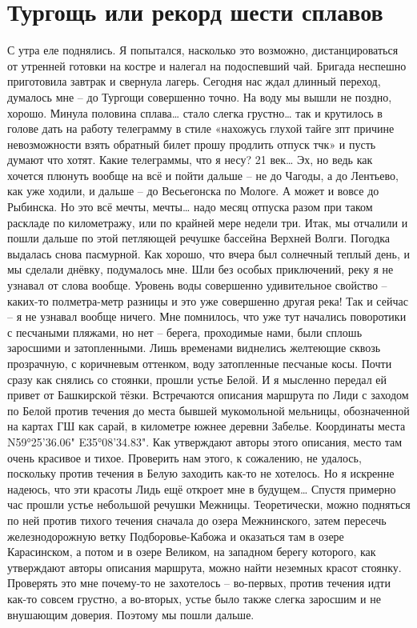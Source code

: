 \chapter{Тургощь или рекорд шести сплавов} 

С утра еле поднялись. Я попытался, насколько это возможно, дистанцироваться от утренней готовки на костре и налегал на подоспевший чай. Бригада неспешно приготовила завтрак и свернула лагерь. Сегодня нас ждал длинный переход, думалось мне – до Тургощи совершенно точно. На воду мы вышли не поздно, хорошо.  
Минула половина сплава… стало слегка грустно… так и крутилось в голове дать на работу телеграмму в стиле «нахожусь глухой тайге зпт причине невозможности взять обратный билет прошу продлить отпуск тчк» и пусть думают что хотят. Какие телеграммы, что я несу? 21 век… Эх, но ведь как хочется плюнуть вообще на всё и пойти дальше – не до Чагоды, а до Лентьево, как уже ходили, и дальше – до Весьегонска по Мологе. А может и вовсе до Рыбинска. Но это всё мечты, мечты… надо месяц отпуска разом при таком раскладе по километражу, или по крайней мере недели три.
Итак, мы отчалили и пошли дальше по этой петляющей речушке бассейна Верхней Волги. Погодка выдалась снова пасмурной. Как хорошо, что вчера был солнечный теплый день, и мы сделали днёвку, подумалось мне. Шли без особых приключений, реку я не узнавал от слова вообще. Уровень воды совершенно удивительное свойство – каких-то полметра-метр разницы и это уже совершенно другая река! Так и сейчас – я не узнавал вообще ничего. Мне помнилось, что уже тут начались поворотики с песчаными пляжами, но нет – берега, проходимые нами, были сплошь заросшими и затопленными. Лишь временами виднелись желтеющие сквозь прозрачную, с коричневым оттенком, воду затопленные песчаные косы.
Почти сразу как снялись со стоянки, прошли устье Белой. И я мысленно передал ей привет от Башкирской тёзки. Встречаются описания маршрута по Лиди с заходом по Белой против течения до места бывшей мукомольной мельницы, обозначенной на картах ГШ как сарай, в километре южнее деревни Забелье. Координаты места N59°25'36.06" E35°08'34.83". Как утверждают авторы этого описания, место там очень красивое и тихое. Проверить нам этого, к сожалению, не удалось, поскольку против течения в Белую заходить как-то не хотелось. Но я искренне надеюсь, что эти красоты Лидь ещё откроет мне в будущем…
Спустя примерно час прошли устье небольшой речушки Межницы. Теоретически, можно подняться по ней против тихого течения сначала до озера Межнинского, затем пересечь железнодорожную ветку Подборовье-Кабожа и оказаться там в озере Карасинском, а потом и в озере Великом, на западном берегу которого, как утверждают авторы описания маршрута, можно найти неземных красот стоянку. Проверять это мне почему-то не захотелось – во-первых, против течения идти как-то совсем грустно, а во-вторых, устье было также слегка заросшим и не внушающим доверия. Поэтому мы пошли дальше.
